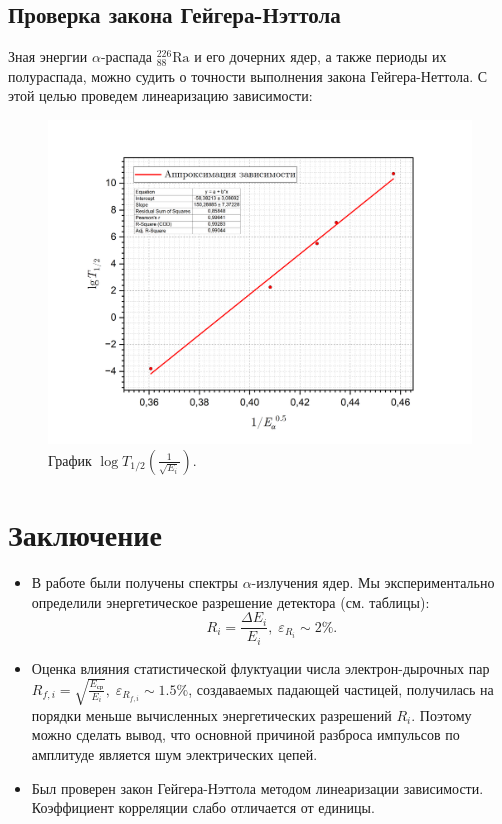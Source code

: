 \documentclass[a4paper, 12pt]{article}
\newcommand{\elem}[3]{{}^{#2}_{#3}\text{#1}}
\newcommand{\Ra}{\elem{Ra}{226}{88}}
\begin{document}
    \subsection{Проверка закона Гейгера-Нэттола}
		
    Зная энергии $\alpha$-распада $\Ra$ и его дочерних ядер, а также периоды их полураспада, можно судить о точности выполнения закона Гейгера-Неттола. С этой целью проведем линеаризацию зависимости:
	
    \begin{figure}[H]
        \centering
        \includegraphics[width = 12 cm]{images/graph_TE.png}
        \caption{График $\log{T_{1/2}} \left( \frac{1}{\sqrt{E_i}}\right)$.}
        \label{fig:te}
    \end{figure}

    \section{Заключение}

    \begin{itemize}
        \item В работе были получены спектры $\alpha$-излучения ядер. Мы экспериментально определили энергетическое разрешение детектора (см. таблицы):
        $$R_i = \frac{\Delta E_i}{E_i},\; \varepsilon_{R_i} \sim 2 \%.$$

        \item Оценка влияния статистической флуктуации числа электрон-дырочных пар $R_{f,i} = \sqrt{\frac{E_{\text{ср}}}{E_i}}, \; \varepsilon_{R_{f,i}} \sim 1.5 \%$, создаваемых падающей частицей, получилась на порядки меньше вычисленных энергетических разрешений $R_i$. Поэтому можно сделать вывод, что основной причиной разброса импульсов по амплитуде является шум электрических цепей.

        \item Был проверен закон Гейгера-Нэттола методом линеаризации зависимости. Коэффициент корреляции слабо отличается от единицы.
    \end{itemize}
    
\end{document}
